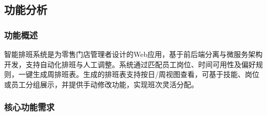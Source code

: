 \documentclass{ctexart}
\begin{document}
\subsection{功能分析}
\subsubsection{功能概述}

智能排班系统是为零售门店管理者设计的Web应用，基于前后端分离与微服务架构开发，支持自动化排班与人工调整。系统通过匹配员工岗位、时间可用性及偏好规则，一键生成周排班表。生成的排班表支持按日/周视图查看，可基于技能、岗位或员工分组展示，并提供手动修改功能，实现班次灵活分配。

\subsubsection{核心功能需求}
\end{document}
